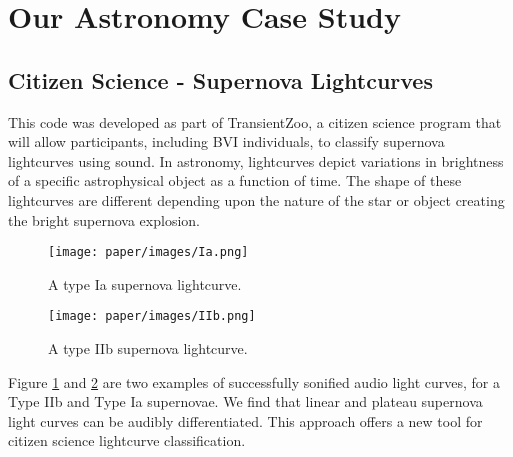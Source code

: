 \documentclass[]{acmsiggraph}
\begin{document}





\section{Our Astronomy Case Study}
\subsection{Citizen Science - Supernova Lightcurves}
This code was developed as part of TransientZoo, a citizen science program that will allow participants, including BVI individuals, to classify supernova lightcurves using sound. In astronomy, lightcurves depict variations in brightness of a specific astrophysical object as a function of time. The shape of these lightcurves are different depending upon the nature of the star or object creating the bright supernova explosion.


\begin{figure}[h]
\centering
\texttt{[image: paper/images/Ia.png]}
\caption{A type Ia supernova lightcurve.}
\label{fig:Ia}
\end{figure}

\begin{figure}[h]
\centering
\texttt{[image: paper/images/IIb.png]}
\caption{A type IIb supernova lightcurve.}
\label{fig:IIb}
\end{figure}

Figure \ref{fig:Ia} and \ref{fig:IIb} are two examples of successfully sonified audio light curves, for a Type IIb and Type Ia supernovae. We find that linear and plateau supernova light curves can be audibly differentiated. This approach offers a new tool for citizen science lightcurve classification.
\end{document}

